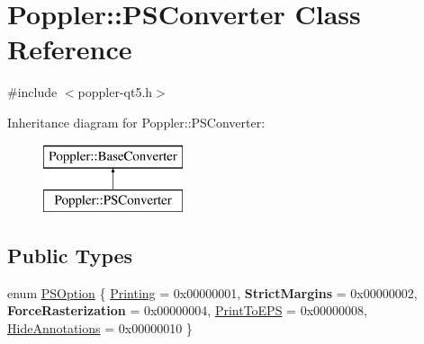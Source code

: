 \hypertarget{class_poppler_1_1_p_s_converter}{}\section{Poppler\+:\+:P\+S\+Converter Class Reference}
\label{class_poppler_1_1_p_s_converter}


{\ttfamily \#include $<$poppler-\/qt5.\+h$>$}

Inheritance diagram for Poppler\+:\+:P\+S\+Converter\+:\begin{figure}[H]
\begin{center}
\leavevmode
\includegraphics[height=2.000000cm]{class_poppler_1_1_p_s_converter}
\end{center}
\end{figure}
\subsection*{Public Types}
\begin{DoxyCompactItemize}
\item 
enum \hyperlink{class_poppler_1_1_p_s_converter_a3577a2109eceaf783ce4b0c51cd5c5b3}{P\+S\+Option} \{ \newline
\hyperlink{class_poppler_1_1_p_s_converter_a3577a2109eceaf783ce4b0c51cd5c5b3aafbba87d5aedf2373ef24086e2d900fb}{Printing} = 0x00000001, 
{\bfseries Strict\+Margins} = 0x00000002, 
{\bfseries Force\+Rasterization} = 0x00000004, 
\hyperlink{class_poppler_1_1_p_s_converter_a3577a2109eceaf783ce4b0c51cd5c5b3ae5039d580000741162804cb3e2ad332c}{Print\+To\+E\+PS} = 0x00000008, 
\newline
\hyperlink{class_poppler_1_1_p_s_converter_a3577a2109eceaf783ce4b0c51cd5c5b3ab5286f62bdece4c9b120ecb1a98ecb89}{Hide\+Annotations} = 0x00000010
 \}
\end{DoxyCompactItemize}
